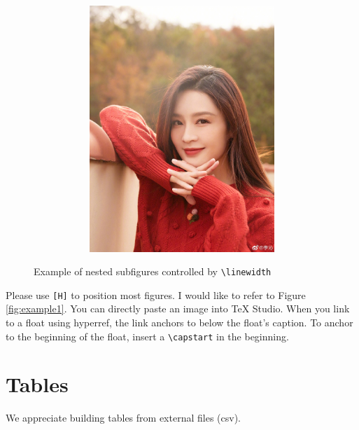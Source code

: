 \documentclass[a4paper]{article}
\begin{document}
\begin{figure}[H]
\begin{subfigure}{0.4\linewidth}
\begin{subfigure}{0.49\linewidth}
			\includegraphics[width=\linewidth]{images/lq4}
			\caption{}
		\end{subfigure}
	\end{subfigure}
	
	\cprotect\caption{Example of nested subfigures controlled by \verb|\linewidth|}
	\label{fig:example2}
\end{figure}

Please use \texttt{[H]} to position most figures. I would like to refer to Figure \ref{fig:example1}. You can directly paste an image into \TeX{} Studio. When you link to a float using hyperref, the link anchors to below the float's caption. To anchor to the beginning of the float, insert a \verb|\capstart| in the beginning.

\section{Tables}
We appreciate building tables from external files (csv).
\end{document}
